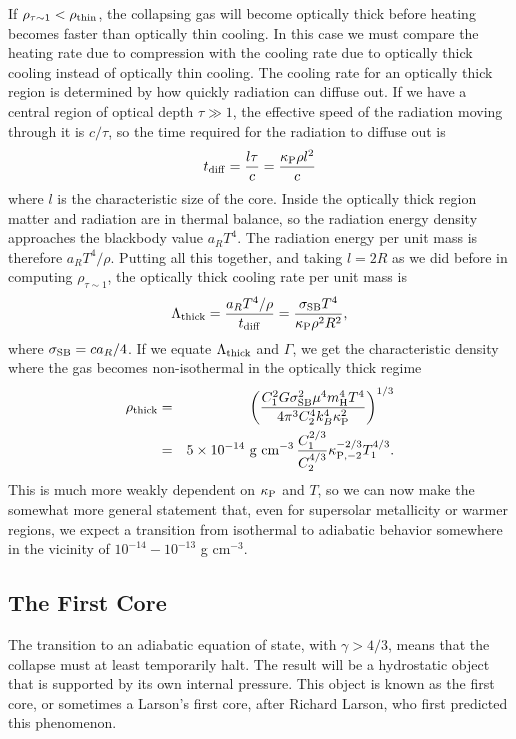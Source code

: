 If $\rho_{\tau\sim 1} < \rho_{\rm thin}$, the collapsing gas will become optically thick before heating becomes faster than optically thin cooling. In this case we must compare the heating rate due to compression with the cooling rate due to optically thick cooling instead of optically thin cooling. The cooling rate for an optically thick region is determined by how quickly radiation can diffuse out. If we have a central region of optical depth $\tau\gg 1$, the effective speed of the radiation moving through it is $c/\tau$, so the time required for the radiation to diffuse out is
\begin{equation}
t_{\rm diff} = \frac{l\tau}{c} = \frac{\kappa_{\rm P} \rho l^2}{c}
\end{equation}
where $l$ is the characteristic size of the core. Inside the optically thick region matter and radiation are in thermal balance, so the radiation energy density approaches the blackbody value $a_R T^4$. The radiation energy per unit mass is therefore $a_R T^4/\rho$. Putting all this together, and taking $l=2 R$ as we did before in computing $\rho_{\tau\sim 1}$, the optically thick cooling rate per unit mass is
\begin{equation}
\Lambda_{\rm thick} = \frac{a_R T^4/\rho}{t_{\rm diff}} = \frac{\sigma_{\rm SB} T^4}{\kappa_{\rm P} \rho^2 R^2},
\end{equation}
where $\sigma_{\rm SB} =ca_R /4$. If we equate $\Lambda_{\rm thick}$ and $\Gamma$, we get the characteristic density where the gas becomes non-isothermal in the optically thick regime
\begin{eqnarray}
\rho_{\rm thick} & = & \left(\frac{C_1^2 G \sigma_{\rm SB}^2 \mu^4 m_{\rm H}^4 T^4}{4\pi^3 C_2^4 k_B^4 \kappa_{\rm P}^2}\right)^{1/3} \\
& = & 5\times 10^{-14}\mbox{ g cm}^{-3}\, \frac{C_1^{2/3}}{C_2^{4/3}} \kappa_{\rm P,-2}^{-2/3} T_1^{4/3}.
\end{eqnarray}
This is much more weakly dependent on $\kappa_{\rm P}$ and $T$, so we can now make the somewhat more general statement that, even for supersolar metallicity or warmer regions, we expect a transition from isothermal to adiabatic behavior somewhere in the vicinity of $10^{-14}-10^{-13}$ g cm$^{-3}$.

\subsection{The First Core}

The transition to an adiabatic equation of state, with $\gamma>4/3$, means that the collapse must at least temporarily halt. The result will be a hydrostatic object that is supported by its own internal pressure. This object is known as the first core, or sometimes a Larson's first core, after Richard Larson, who first predicted this phenomenon.

